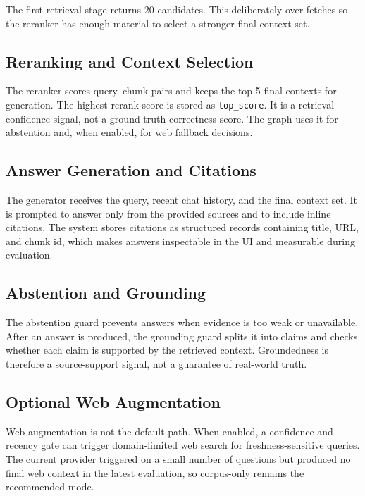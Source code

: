 \documentclass[11pt]{article}
\begin{document}
The first retrieval stage returns 20 candidates. This deliberately over-fetches so the
reranker has enough material to select a stronger final context set.

\subsection{Reranking and Context Selection}

The reranker scores query--chunk pairs and keeps the top 5 final contexts for generation.
The highest rerank score is stored as \texttt{top\_score}. It is a retrieval-confidence
signal, not a ground-truth correctness score. The graph uses it for abstention and, when
enabled, for web fallback decisions.

\subsection{Answer Generation and Citations}

The generator receives the query, recent chat history, and the final context set. It is
prompted to answer only from the provided sources and to include inline citations. The
system stores citations as structured records containing title, URL, and chunk id, which
makes answers inspectable in the UI and measurable during evaluation.

\subsection{Abstention and Grounding}

The abstention guard prevents answers when evidence is too weak or unavailable. After an
answer is produced, the grounding guard splits it into claims and checks whether each claim
is supported by the retrieved context. Groundedness is therefore a source-support signal,
not a guarantee of real-world truth.

\subsection{Optional Web Augmentation}

Web augmentation is not the default path. When enabled, a confidence and recency gate can
trigger domain-limited web search for freshness-sensitive queries. The current provider
triggered on a small number of questions but produced no final web context in the latest
evaluation, so corpus-only remains the recommended mode.
\end{document}
